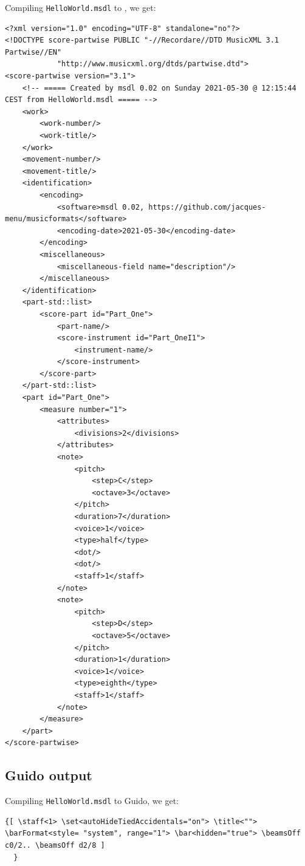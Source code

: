 Compiling {\tt HelloWorld.msdl} to \mxml, we get:
\begin{lstlisting}[language=MusicXML]
<?xml version="1.0" encoding="UTF-8" standalone="no"?>
<!DOCTYPE score-partwise PUBLIC "-//Recordare//DTD MusicXML 3.1 Partwise//EN"
			"http://www.musicxml.org/dtds/partwise.dtd">
<score-partwise version="3.1">
    <!-- ===== Created by msdl 0.02 on Sunday 2021-05-30 @ 12:15:44 CEST from HelloWorld.msdl ===== -->
    <work>
        <work-number/>
        <work-title/>
    </work>
    <movement-number/>
    <movement-title/>
    <identification>
        <encoding>
            <software>msdl 0.02, https://github.com/jacques-menu/musicformats</software>
            <encoding-date>2021-05-30</encoding-date>
        </encoding>
        <miscellaneous>
            <miscellaneous-field name="description"/>
        </miscellaneous>
    </identification>
    <part-std::list>
        <score-part id="Part_One">
            <part-name/>
            <score-instrument id="Part_OneI1">
                <instrument-name/>
            </score-instrument>
        </score-part>
    </part-std::list>
    <part id="Part_One">
        <measure number="1">
            <attributes>
                <divisions>2</divisions>
            </attributes>
            <note>
                <pitch>
                    <step>C</step>
                    <octave>3</octave>
                </pitch>
                <duration>7</duration>
                <voice>1</voice>
                <type>half</type>
                <dot/>
                <dot/>
                <staff>1</staff>
            </note>
            <note>
                <pitch>
                    <step>D</step>
                    <octave>5</octave>
                </pitch>
                <duration>1</duration>
                <voice>1</voice>
                <type>eighth</type>
                <staff>1</staff>
            </note>
        </measure>
    </part>
</score-partwise>
\end{lstlisting}

\subsection{Guido output}

Compiling {\tt HelloWorld.msdl} to Guido, we get:
\begin{lstlisting}[language=Guido]
{[ \staff<1> \set<autoHideTiedAccidentals="on"> \title<""> \barFormat<style= "system", range="1"> \bar<hidden="true"> \beamsOff c0/2.. \beamsOff d2/8 ]
  }
\end{lstlisting}


